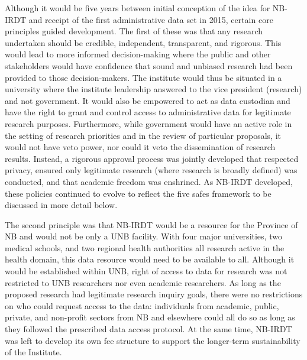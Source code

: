 \documentclass[
]{WileySix}
\begin{document}
Although it would be five years between initial conception of the idea for NB-IRDT and receipt of the first administrative data set in 2015, certain core principles guided development. The first of these was that any research undertaken should be credible, independent, transparent, and rigorous. This would lead to more informed decision-making where the public and other stakeholders would have confidence that sound and unbiased research had been provided to those decision-makers. The institute would thus be situated in a university where the institute leadership answered to the vice president (research) and not government. It would also be empowered to act as data custodian and have the right to grant and control access to administrative data for legitimate research purposes. Furthermore, while government would have an active role in the setting of research priorities and in the review of particular proposals, it would not have veto power, nor could it veto the dissemination of research results. Instead, a rigorous approval process was jointly developed that respected privacy, ensured only legitimate research (where research is broadly defined) was conducted, and that academic freedom was enshrined. As NB-IRDT developed, these policies continued to evolve to reflect the five safes framework to be discussed in more detail below.

The second principle was that NB-IRDT would be a resource for the Province of NB and would not be only a UNB facility. With four major universities, two medical schools, and two regional health authorities all research active in the health domain, this data resource would need to be available to all. Although it would be established within UNB, right of access to data for research was not restricted to UNB researchers nor even academic researchers. As long as the proposed research had legitimate research inquiry goals, there were no restrictions on who could request access to the data: individuals from academic, public, private, and non-profit sectors from NB and elsewhere could all do so as long as they followed the prescribed data access protocol. At the same time, NB-IRDT was left to develop its own fee structure to support the longer-term sustainability of the Institute.
\end{document}
